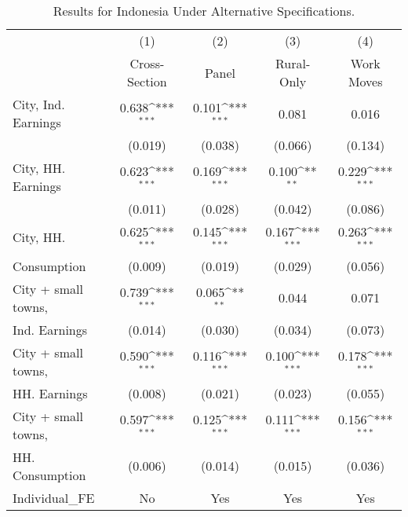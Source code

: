 \begin{table}[htbp]\centering
\def\sym#1{\ifmmode^{#1}\else\(^{#1}\)\fi}
\caption{Results for Indonesia Under Alternative Specifications.}
\begin{tabular}{l*{4}{c}}
\toprule
                    &\multicolumn{1}{c}{(1)}&\multicolumn{1}{c}{(2)}&\multicolumn{1}{c}{(3)}&\multicolumn{1}{c}{(4)}\\
                    &\multicolumn{1}{c}{Cross-Section}&\multicolumn{1}{c}{Panel}&\multicolumn{1}{c}{Rural-Only}&\multicolumn{1}{c}{Work Moves}\\
\midrule
City, Ind. Earnings &       0.638\sym{***}&       0.101\sym{***}&       0.081         &       0.016         \\
                    &     (0.019)         &     (0.038)         &     (0.066)         &     (0.134)         \\
\addlinespace
City, HH. Earnings  &       0.623\sym{***}&       0.169\sym{***}&       0.100\sym{**} &       0.229\sym{***}\\
                    &     (0.011)         &     (0.028)         &     (0.042)         &     (0.086)         \\
\addlinespace
City, HH.           &       0.625\sym{***}&       0.145\sym{***}&       0.167\sym{***}&       0.263\sym{***}\\
Consumption         &     (0.009)         &     (0.019)         &     (0.029)         &     (0.056)         \\
\addlinespace
City + small towns, &       0.739\sym{***}&       0.065\sym{**} &       0.044         &       0.071         \\
Ind. Earnings       &     (0.014)         &     (0.030)         &     (0.034)         &     (0.073)         \\
\addlinespace
City + small towns, &       0.590\sym{***}&       0.116\sym{***}&       0.100\sym{***}&       0.178\sym{***}\\
HH. Earnings        &     (0.008)         &     (0.021)         &     (0.023)         &     (0.055)         \\
\addlinespace
City + small towns, &       0.597\sym{***}&       0.125\sym{***}&       0.111\sym{***}&       0.156\sym{***}\\
HH. Consumption     &     (0.006)         &     (0.014)         &     (0.015)         &     (0.036)         \\
\midrule
Individual\_FE       &          No         &         Yes         &         Yes         &         Yes         \\

\end{tabular}
\end{table}
